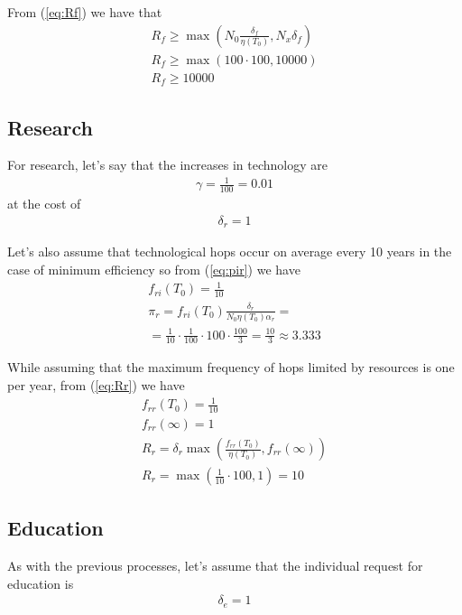 \documentclass[a4paper,twoside]{article}
\begin{document}
From (\ref{eq:Rf}) we have that
\begin{align*}
	R_f \ge \max \left(N_0 \frac{\delta_f}{\eta(T_0)}, N_x \delta_f \right)
	\\
	R_f \ge \max \left(100 \cdot 100, 10000 \right)
	\\
	R_f \ge 10000
\end{align*}

\subsection{Research}

For research, let's say that the increases in technology are
\begin{align*}
	\gamma = \frac{1}{100} = 0.01
\end{align*}
at the cost of
\begin{align*}
	\delta_r = 1
\end{align*}

Let's also assume that technological hops occur on average every 10 years in the case of minimum efficiency so from (\ref{eq:pir}) we have
\begin{align*}
	f_{ri}(T_0) = \frac{1}{10}
	\\
	\pi_r = f_{ri}(T_0) \frac{\delta_r}{N_0 \eta(T_0) \alpha_r} =
	\\
	= \frac{1}{10} \cdot \frac{1}{100} \cdot 100 \cdot \frac{100}{3}
	= \frac{10}{3} \approx 3.333
\end{align*}

While assuming that the maximum frequency of hops limited by resources is one per year, from (\ref{eq:Rr}) we have
\begin{align*}
	f_{rr}(T_0) = \frac{1}{10}
	\\
	f_{rr}(\infty) = 1
	\\
	R_r = \delta_r \max \left( \frac{f_{rr}(T_0)}{\eta(T_0)}, f_{rr}(\infty) \right)
	\\
	R_r = \max \left( \frac{1}{10} \cdot 100, 1 \right) = 10
\end{align*}

\subsection{Education}

As with the previous processes, let's assume that the individual request for education is
\begin{align*}
	\delta_e = 1
\end{align*}
\end{document}
